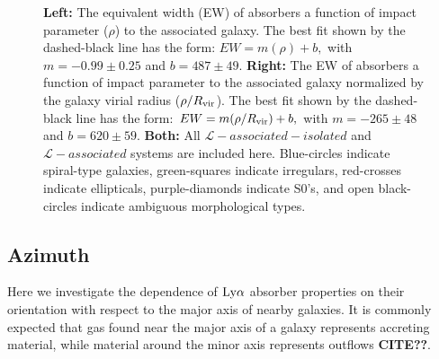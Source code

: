 \documentclass[twocolumn,tighten]{aastex62}
\begin{document}
\begin{figure}[t!]
        \centering
        \vspace{0pt}
        \caption{\small{\textbf{Left: } The equivalent width (EW) of absorbers a function of impact parameter ($\rho$) to the associated galaxy. The best fit shown by the dashed-black line has the form: $EW = m (\rho) + b,$ with $m = -0.99 \pm 0.25$ and $b = 487 \pm 49$. \textbf{Right:} The EW of absorbers a function of impact parameter to the associated galaxy normalized by the galaxy virial radius ($\rho / R_{\rm vir}$). The best fit shown by the dashed-black line has the form: $EW = m (\rho / R_{\rm vir}) + b,$ with $m = -265 \pm 48$ and $b = 620 \pm 59$. \textbf{Both:} All $\mathcal{L}-associated-isolated$ and $\mathcal{L}-associated$ systems are included here. Blue-circles indicate spiral-type galaxies, green-squares indicate irregulars, red-crosses indicate ellipticals, purple-diamonds indicate S0's, and open black-circles indicate ambiguous morphological types. }}
        \vspace{5pt}
        \label{ew_both}
\end{figure}


\subsection{Azimuth}
Here we investigate the dependence of $\rm Ly\alpha$ absorber properties on their orientation with respect to the major axis of nearby galaxies. It is commonly expected that gas found near the major axis of a galaxy represents accreting material, while material around the minor axis represents outflows \textbf{CITE??}. 
\end{document}
